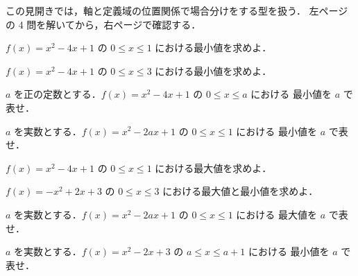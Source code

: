 \documentclass[lualatex,paper=b5j,fontsize=10pt,twoside]{jlreq}
\begin{document}
\MakeMathMagazineTitle

この見開きでは，軸と定義域の位置関係で場合分けをする型を扱う．
左ページの 4 問を解いてから，右ページで確認する．

\MSStartVerso


\begin{mmproblems}
  \item $f(x)=x^2-4x+1$ の $0\leq x\leq 1$ における最小値を求めよ．

  \item $f(x)=x^2-4x+1$ の $0\leq x\leq 3$ における最小値を求めよ．

  \item $a$ を正の定数とする．$f(x)=x^2-4x+1$ の $0\leq x\leq a$ における
    最小値を $a$ で表せ．

  \item $a$ を実数とする．$f(x)=x^2-2ax+1$ の $0\leq x\leq 1$ における
    最小値を $a$ で表せ．

  \item $f(x)=x^2-4x+1$ の $0\leq x\leq 1$ における最大値を求めよ．

  \item $f(x)=-x^2+2x+3$ の $0\leq x\leq 3$ における最大値と最小値を求めよ．

  \item $a$ を実数とする．$f(x)=x^2-2ax+1$ の $0\leq x\leq 1$ における
    最大値を $a$ で表せ．

  \item $a$ を実数とする．$f(x)=x^2-2x+3$ の $a\leq x\leq a+1$ における
    最小値を $a$ で表せ．
\end{mmproblems}

\clearpage

\end{document}
